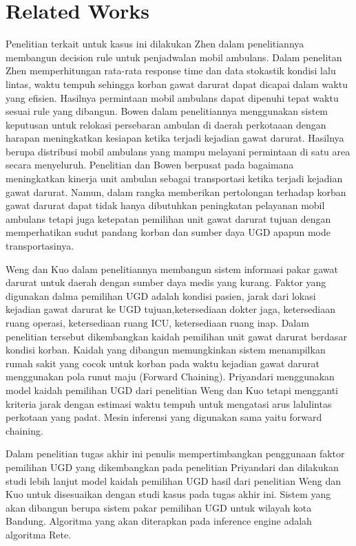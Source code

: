 \section{Related Works}
Penelitian terkait untuk kasus ini dilakukan Zhen \cite{zhen2014} dalam penelitiannya membangun  decision rule  untuk  penjadwalan mobil ambulans. Dalam penelitan Zhen \cite{zhen2014} memperhitungan rata-rata response time dan data stokastik kondisi lalu lintas, waktu tempuh sehingga korban gawat darurat dapat dicapai dalam waktu yang efisien. Hasilnya permintaan mobil ambulans dapat dipenuhi tepat waktu sesuai rule yang dibangun. Bowen \cite{james1998} dalam penelitiannya menggunakan sistem keputusan untuk relokasi persebaran ambulan di daerah perkotaaan dengan harapan meningkatkan kesiapan ketika terjadi kejadian gawat darurat.  Hasilnya berupa distribusi mobil ambulans yang mampu melayani permintaan di satu area secara menyeluruh. Penelitian \cite{zhen2014} dan Bowen \cite{james1998} berpusat pada bagaimana meningkatkan kinerja unit ambulan sebagai transportasi ketika terjadi kejadian gawat darurat. Namun, dalam rangka memberikan pertolongan terhadap korban gawat darurat dapat tidak hanya dibutuhkan peningkatan pelayanan mobil ambulans tetapi juga ketepatan pemilihan unit gawat darurat tujuan dengan memperhatikan sudut pandang korban dan sumber daya UGD apapun mode transportasinya.   \par
Weng dan Kuo \cite{weng2009} dalam penelitiannya membangun sistem informasi pakar gawat darurat untuk daerah dengan sumber daya medis yang kurang. Faktor yang digunakan dalma pemilihan UGD adalah kondisi pasien, jarak dari lokasi kejadian gawat darurat ke UGD tujuan,ketersediaan dokter jaga, ketersediaan ruang operasi, ketersediaan ruang ICU, ketersediaan ruang inap. Dalam penelitian tersebut dikembangkan kaidah pemilihan unit gawat darurat berdasar kondisi korban. Kaidah yang dibangun memungkinkan sistem menampilkan rumah sakit yang cocok untuk korban pada waktu kejadian gawat darurat menggunakan pola runut maju (Forward Chaining). Priyandari \cite{priyandari2011} menggunakan model kaidah pemilihan UGD dari penelitian Weng dan Kuo tetapi mengganti kriteria jarak dengan estimasi waktu tempuh untuk mengatasi arus lalulintas perkotaan yang padat. Mesin inferensi yang digunakan sama yaitu forward chaining.
\par
Dalam penelitian tugas akhir ini penulis mempertimbangkan penggunaan faktor pemilihan UGD yang dikembangkan pada penelitian Priyandari \cite{priyandari2011} dan dilakukan studi lebih lanjut model kaidah pemilihan UGD hasil dari penelitian Weng dan Kuo \cite{weng2009} untuk disesuaikan dengan studi kasus pada tugas akhir ini. Sistem yang akan dibangun berupa sistem pakar pemilihan UGD untuk wilayah kota Bandung. Algoritma yang akan diterapkan pada inference engine adalah algoritma Rete. 

